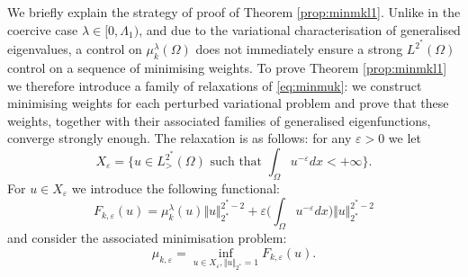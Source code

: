 \documentclass[10pt]{amsart}
\numberwithin{equation}{section}
\newcommand{\ve}{\varepsilon}
\newcommand{\Om}{\Omega}
\newcommand{\mkl}{\mu_{k}^{\lambda}}
\newcommand{\mkle}{\mu_{k,\ve}}
\newcommand{\Fke}{F_{k,\ve}}
\theoremstyle{plain}
\theoremstyle{remark}
\begin{document}
We briefly explain the strategy of proof of Theorem \ref{prop:minmkl1}. Unlike in the coercive case $\lambda \in [0, \Lambda_1)$, and due to the variational characterisation of generalised eigenvalues, a control on $\mkl(\Omega)$ does not immediately ensure a strong $L^{2^*}(\Om)$ control on a sequence of minimising weights. To prove Theorem \ref{prop:minmkl1} we therefore introduce a family of relaxations of \eqref{eq:minmuk}: we construct minimising weights for each perturbed variational problem and prove that these weights, together with their associated families of generalised eigenfunctions, converge strongly enough. The relaxation is as follows: for any $\ve >0$ we let 
$$ X_\ve = \Big \{ u \in L^{2^*}_{>}(\Om) \text{ such that } \int_{\Om} u^{-\ve}dx < + \infty \Big \}. $$
For $u \in X_\ve$ we introduce the following functional:
\begin{equation} \label{Fkeps}
\Fke(u) = \mkl(u) \Vert u \Vert_{2^*}^{2^*-2} + \ve  \Big(\int_{\Om} u^{-\ve}dx \Big)\Vert u \Vert_{2^*}^{2^*-2}
\end{equation}
and consider the associated minimisation problem:
\begin{equation} \label{mukeps}
\mkle = \inf_{u \in X_\ve, \Vert u \Vert_{2^*}=1} \Fke(u). 
\end{equation}
\end{document}
